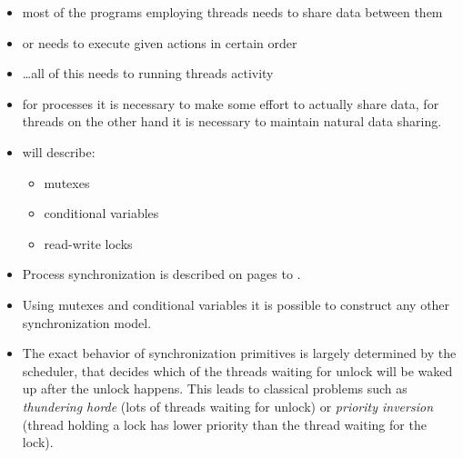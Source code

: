 
\begin{slide}

\begin{itemize}
\item most of the programs employing threads needs to share data between them
\item or needs to execute given actions in certain order
\item \dots{}all of this needs to  running threads activity
\item for processes it is necessary to make some effort to actually share data,
for threads on the other hand it is necessary to maintain natural data sharing.
\item will describe:
\begin{itemize}
\item mutexes
\item conditional variables
\item read-write locks
\end{itemize}
\end{itemize}
\end{slide}

\label{THREADSYNCHRONIZATION}

\begin{itemize}
\item Process synchronization is described on pages
\pageref{SYNCHRONIZATION} to \pageref{SYNCHRONIZATIONEND}.
\item Using mutexes and conditional variables it is possible to construct any
other synchronization model.
\item The exact behavior of synchronization primitives is largely determined by
the scheduler, that decides which of the threads waiting for unlock will be
waked up after the unlock happens. This leads to classical problems such as
\emph{thundering horde} (lots of threads waiting for unlock)
or \emph{priority inversion} (thread holding a lock has lower priority than
the thread waiting for the lock).
\end{itemize}



